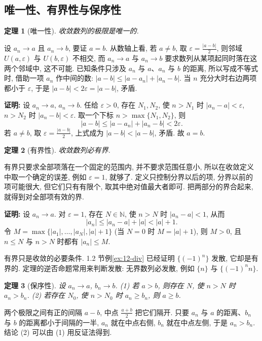 \documentclass[UTF8,openany]{ctexbook}
\theoremstyle{chinesetextbook}
\newtheorem{theorem}{定理}[section]
\newenvironment{cnproof}{\par\indent\textbf{证明:} \ignorespaces}{\par}
\begin{document}
\subsection{唯一性、有界性与保序性}
\begin{theorem}[唯一性]
收敛数列的极限是唯一的.
\end{theorem}
设 $a_n\to a$ 且 $a_n\to b$, 要证 $a=b$. 从数轴上看, 若 $a\ne b$, 取 $\displaystyle\varepsilon=\frac{|a-b|}2$, 则邻域 $U(a,\varepsilon)$ 与 $U(b,\varepsilon)$ 不相交, 而 $a_n\to a$ 与 $a_n\to b$ 要求数列从某项起同时落在这两个邻域中, 这不可能. 已知条件只涉及 $a_n$ 与 $a$、$a_n$ 与 $b$ 的距离, 所以写成不等式时, 借助一项 $a_n$ 作中间的数: $|a-b|\le|a-a_n|+|a_n-b|$. 当 $n$ 充分大时右边两项都小于 $\varepsilon$, 于是 $|a-b|<2\varepsilon=|a-b|$, 矛盾.
\begin{cnproof}
设 $a_n\to a$, $a_n\to b$. 任给 $\varepsilon>0$, 存在 $N_1,N_2$, 使 $n>N_1$ 时 $|a_n-a|<\varepsilon$, $n>N_2$ 时 $|a_n-b|<\varepsilon$. 取一个下标 $n>\max\{N_1,N_2\}$, 则
\[
|a-b|\le|a-a_n|+|a_n-b|<2\varepsilon.
\]
若 $a\ne b$, 取 $\displaystyle\varepsilon=\frac{|a-b|}2$, 上式成为 $|a-b|<|a-b|$, 矛盾. 故 $a=b$.
\end{cnproof}
\begin{theorem}[有界性]
收敛数列必有界.
\end{theorem}
有界只要求全部项落在一个固定的范围内, 并不要求范围任意小, 所以在收敛定义中取一个确定的误差, 例如 $\varepsilon=1$, 就够了. 定义只控制分界以后的项, 分界以前的项可能很大, 但它们只有有限个, 取其中绝对值最大者即可. 把两部分的界合起来, 就得到对全部项有效的界.
\begin{cnproof}
设 $a_n\to a$. 对 $\varepsilon=1$, 存在 $N\in\mathbb N$, 使 $n>N$ 时 $|a_n-a|<1$, 从而
\[
|a_n|\le|a_n-a|+|a|<|a|+1.
\]
令 $M=\max\{|a_1|,\ldots,|a_N|,|a|+1\}$ (当 $N=0$ 时 $M=|a|+1$), 则 $M>0$, 且 $n\le N$ 与 $n>N$ 时都有 $|a_n|\le M$.
\end{cnproof}
有界只是收敛的必要条件. 1.2 节例\ref{ex:12-div} 已经证明 $\{(-1)^n\}$ 发散, 它却是有界的. 定理的逆否命题常用来判断发散: 无界数列必发散, 例如 $\{n\}$ 与 $\{(-1)^nn\}$.
\begin{theorem}[保序性]
设 $a_n\to a$, $b_n\to b$. \textup{(1)} 若 $a>b$, 则存在 $N$, 使 $n>N$ 时 $a_n>b_n$. \textup{(2)} 若存在 $N_0$, 使 $n>N_0$ 时 $a_n\ge b_n$, 则 $a\ge b$.
\end{theorem}
两个极限之间有正的间隔 $a-b$, 中点 $\displaystyle\frac{a+b}2$ 把它们隔开. 只要 $a_n$ 与 $a$ 的距离、$b_n$ 与 $b$ 的距离都小于间隔的一半, $a_n$ 就在中点右侧, $b_n$ 就在中点左侧, 于是 $a_n>b_n$. 结论 (2) 可以由 (1) 用反证法得到.
\end{document}
